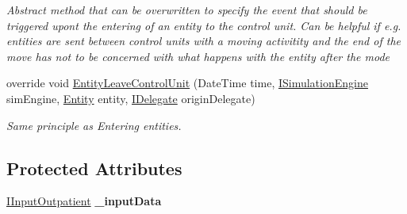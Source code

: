 \begin{DoxyCompactItemize}
\begin{DoxyCompactList}\small\item\em Abstract method that can be overwritten to specify the event that should be triggered upont the entering of an entity to the control unit. Can be helpful if e.\+g. entities are sent between control units with a moving activitity and the end of the move has not to be concerned with what happens with the entity after the mode \end{DoxyCompactList}\item 
override void \hyperlink{class_general_health_care_elements_1_1_department_models_1_1_outpatient_1_1_control_unit_outpatient_a72e47a0ef3569eba52b7708f61ecc032}{Entity\+Leave\+Control\+Unit} (Date\+Time time, \hyperlink{interface_simulation_core_1_1_simulation_classes_1_1_i_simulation_engine}{I\+Simulation\+Engine} sim\+Engine, \hyperlink{class_simulation_core_1_1_h_c_c_m_elements_1_1_entity}{Entity} entity, \hyperlink{interface_simulation_core_1_1_h_c_c_m_elements_1_1_i_delegate}{I\+Delegate} origin\+Delegate)
\begin{DoxyCompactList}\small\item\em Same principle as Entering entities. \end{DoxyCompactList}\end{DoxyCompactItemize}
\subsection*{Protected Attributes}
\begin{DoxyCompactItemize}
\item 
\hyperlink{interface_general_health_care_elements_1_1_department_models_1_1_outpatient_1_1_i_input_outpatient}{I\+Input\+Outpatient} {\bfseries \+\_\+input\+Data}\hypertarget{class_general_health_care_elements_1_1_department_models_1_1_outpatient_1_1_control_unit_outpatient_a093ad1336ac89948dd28a00a9fce4312}{}\label{class_general_health_care_elements_1_1_department_models_1_1_outpatient_1_1_control_unit_outpatient_a093ad1336ac89948dd28a00a9fce4312}

\end{DoxyCompactItemize}
